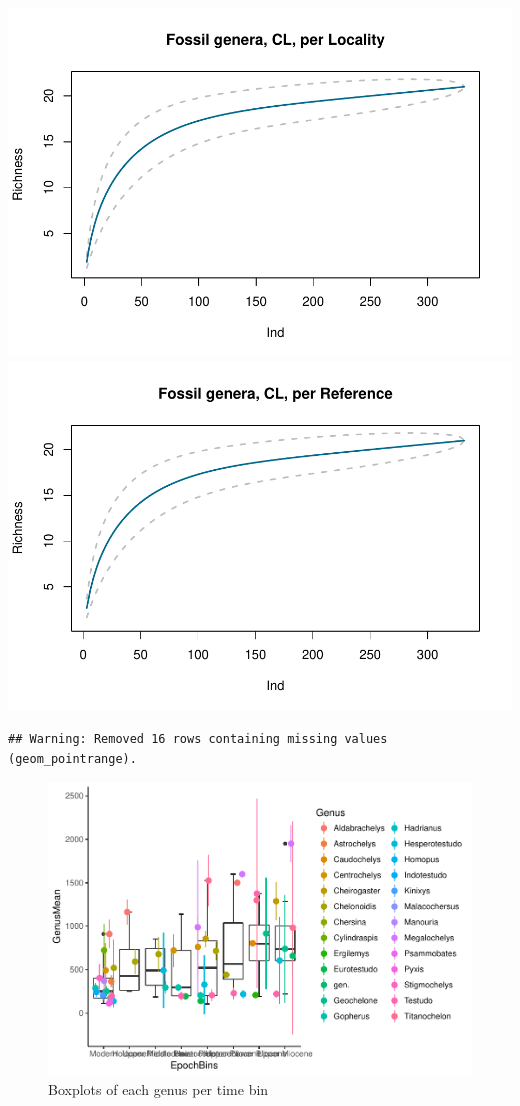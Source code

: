 \documentclass[]{article}
\begin{document}
\includegraphics{MA_JJ_files/figure-latex/Species Accumulation Curve with Genera-1.pdf}
\includegraphics{MA_JJ_files/figure-latex/Species Accumulation Curve with Genera-2.pdf}

\begin{verbatim}
## Warning: Removed 16 rows containing missing values (geom_pointrange).
\end{verbatim}

\begin{figure}[htbp]
\centering
\includegraphics{MA_JJ_files/figure-latex/Boxplots of each genus per time bin-1.pdf}
\caption{Boxplots of each genus per time bin}
\end{figure}
\end{document}
